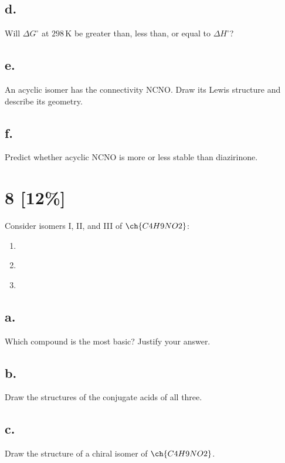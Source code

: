 \documentclass[11pt]{article}
\begin{document}
\subsection*{d.} Will $\Delta G^{\circ}$ at $298\,\text{K}$ be greater than, less than, or equal to $\Delta H^{\circ}$?
\vspace{2cm}

\subsection*{e.} An acyclic isomer has the connectivity NCNO. Draw its Lewis structure and describe its geometry.
\vspace{3cm}

\subsection*{f.} Predict whether acyclic NCNO is more or less stable than diazirinone.
\vspace{2.5cm}

\newpage
\section{8 [12\%]}
Consider isomers I, II, and III of $\ch{C4H9NO2}$:
\begin{center}
\begin{enumerate}[label=\Roman*.]
\item {} \\
\item {} \\
\item {}
\end{enumerate}
\end{center}

\subsection*{a.} Which compound is the most basic? Justify your answer.
\vspace{2.5cm}

\subsection*{b.} Draw the structures of the conjugate acids of all three.
\vspace{3cm}

\subsection*{c.} Draw the structure of a chiral isomer of $\ch{C4H9NO2}$.
\vspace{2.5cm}
\end{document}
